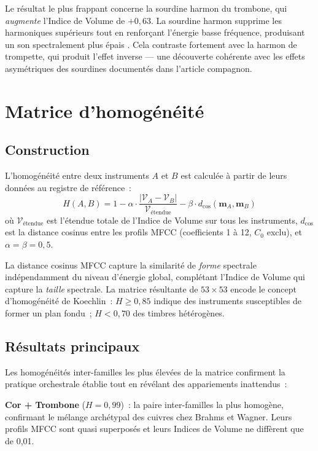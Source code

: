 \documentclass[journal]{IEEEtran}
\begin{document}
Le résultat le plus frappant concerne la sourdine harmon du trombone, qui \emph{augmente} l'Indice de Volume de $+0{,}63$. La sourdine harmon supprime les harmoniques supérieurs tout en renforçant l'énergie basse fréquence, produisant un son spectralement plus \og épais \fg. Cela contraste fortement avec la harmon de trompette, qui produit l'effet inverse --- une découverte cohérente avec les effets asymétriques des sourdines documentés dans l'article compagnon.

\section{Matrice d'homogénéité}
\label{sec:homogeneity}

\subsection{Construction}

L'homogénéité entre deux instruments $A$ et $B$ est calculée à partir de leurs données au registre de référence~:
\begin{equation}
H(A, B) = 1 - \alpha \cdot \frac{|\mathcal{V}_A - \mathcal{V}_B|}{\mathcal{V}_\text{étendue}} - \beta \cdot d_\text{cos}(\mathbf{m}_A, \mathbf{m}_B)
\end{equation}
où $\mathcal{V}_\text{étendue}$ est l'étendue totale de l'Indice de Volume sur tous les instruments, $d_\text{cos}$ est la distance cosinus entre les profils MFCC (coefficients 1 à 12, $C_0$ exclu), et $\alpha = \beta = 0{,}5$.

La distance cosinus MFCC capture la similarité de \emph{forme} spectrale indépendamment du niveau d'énergie global, complétant l'Indice de Volume qui capture la \emph{taille} spectrale. La matrice résultante de $53 \times 53$ encode le concept d'homogénéité de Koechlin~: $H \geq 0{,}85$ indique des instruments susceptibles de former un plan fondu~; $H < 0{,}70$ des timbres hétérogènes.

\subsection{Résultats principaux}

Les homogénéités inter-familles les plus élevées de la matrice confirment la pratique orchestrale établie tout en révélant des appariements inattendus~:

\textbf{Cor + Trombone} ($H = 0{,}99$)~: la paire inter-familles la plus homogène, confirmant le mélange archétypal des cuivres chez Brahms et Wagner. Leurs profils MFCC sont quasi superposés et leurs Indices de Volume ne diffèrent que de 0,01.
\end{document}
